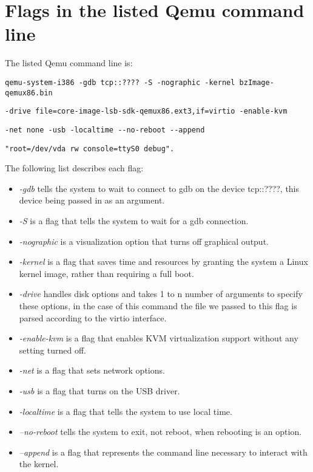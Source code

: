 \documentclass[letterpaper,10pt,titlepage]{article}
\begin{document}
\section{Flags in the listed Qemu command line}
The listed Qemu command line is:
\begin{lstlisting}
qemu-system-i386 -gdb tcp::???? -S -nographic -kernel bzImage-qemux86.bin 
\end{lstlisting}
\begin{lstlisting}
-drive file=core-image-lsb-sdk-qemux86.ext3,if=virtio -enable-kvm 
\end{lstlisting}
\begin{lstlisting}
-net none -usb -localtime --no-reboot --append 
\end{lstlisting}
\begin{lstlisting}
"root=/dev/vda rw console=ttyS0 debug".
\end{lstlisting}

The following list describes each flag:
\begin{itemize}
\item \emph{-gdb} tells the system to wait to connect to gdb on the device tcp::????, this device being passed in as an argument.
\item \emph{-S} is a flag that tells the system to wait for a gdb connection.
\item \emph{-nographic} is a visualization option that turns off graphical output.
\item \emph{-kernel} is a flag that saves time and resources by granting the system a Linux kernel image, rather than requiring a full boot.
\item \emph{-drive} handles disk options and takes 1 to n number of arguments to specify these options, in the case of this command the file we passed to this flag is parsed according to the virtio interface.
\item \emph{-enable-kvm} is a flag that enables KVM virtualization support without any setting turned off.
\item \emph{-net} is a flag that sets network options.
\item \emph{-usb} is a flag that turns on the USB driver.
\item \emph{-localtime} is a flag that tells the system to use local time.
\item \emph{--no-reboot} tells the system to exit, not reboot, when rebooting is an option.
\item \emph{--append} is a flag that represents the command line necessary to interact with the kernel.
\end{itemize}
\end{document}

